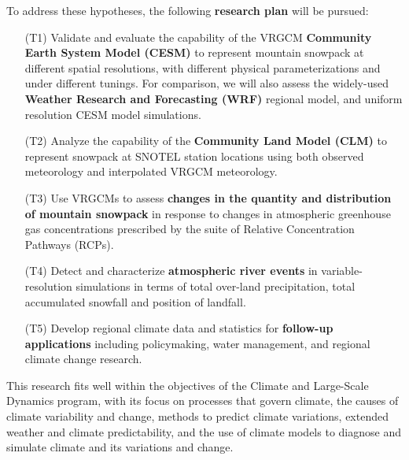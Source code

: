 \documentclass[11pt]{article}
\begin{document}
\vspace{-0.4cm}
To address these hypotheses, the following \textbf{research plan} will be pursued:
\begin{itemize}
\item[(T1)] Validate and evaluate the capability of the VRGCM \textbf{Community Earth System Model (CESM)} to represent mountain snowpack at different spatial resolutions, with different physical parameterizations and under different tunings.  For comparison, we will also assess the widely-used \textbf{Weather Research and Forecasting (WRF)} regional model, and uniform resolution CESM model simulations.
\item[(T2)] Analyze the capability of the \textbf{Community Land Model (CLM)} to represent snowpack at SNOTEL station locations using both observed meteorology and interpolated VRGCM meteorology.
\item[(T3)] Use VRGCMs to assess \textbf{changes in the quantity and distribution of mountain snowpack} in response to changes in atmospheric greenhouse gas concentrations prescribed by the suite of Relative Concentration Pathways (RCPs).
\item[(T4)] Detect and characterize \textbf{atmospheric river events} in variable-resolution simulations in terms of total over-land precipitation, total accumulated snowfall and position of landfall.
\item[(T5)] Develop regional climate data and statistics for \textbf{follow-up applications} including policymaking, water management, and regional climate change research.
\end{itemize}
\vspace{-0.4cm}

This research fits well within the objectives of the Climate and Large-Scale Dynamics program, with its focus on processes that govern climate, the causes of climate variability and change, methods to predict climate variations, extended weather and climate predictability, and the use of climate models to diagnose and simulate climate and its variations and change.
\end{document}
